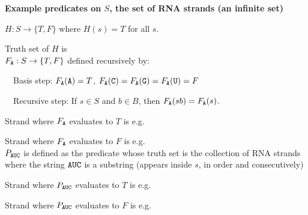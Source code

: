 
{\bf Example predicates on $S$, the set of RNA strands (an infinite set)}


$H: S \to \{T, F\}$ where $H(s) = T$ for all $s$.

Truth set of $H$ is \underline{}\\

$F_{\texttt{A}}: S \to \{T, F\}$  defined recursively by: 

~~Basis step: $F_{\texttt{A}}(\texttt{A}) = T$, $F_{\texttt{A}}(\texttt{C}) = F_{\texttt{A}}(\texttt{G}) = F_{\texttt{A}}(\texttt{U}) = F$

~~Recursive step: If $s \in S$ and $b \in B$, then $F_{\texttt{A}}(sb) = F_{\texttt{A}}(s)$.

Strand where $F_{\texttt{A}}$ evaluates to $T$ is e.g.\underline{\phantom{$\A\C\G$~\hspace{0.3in}}}

Strand where $F_{\texttt{A}}$ evaluates to $F$ is e.g. \underline{\phantom{$\U\A\C\U$\hspace{0.3in}}}\\

$P_{\texttt{A}\texttt{U}\texttt{C}}$ is defined as the predicate whose truth set
is the collection of RNA strands where the string $\texttt{A}\texttt{U}\texttt{C}$
is a substring (appears inside $s$, in order and consecutively)

Strand where $P_{\texttt{A}\texttt{U}\texttt{C}}$ evaluates to $T$ is e.g.\underline{\phantom{$\A\A\A$~\hspace{0.3in}}}

Strand where $P_{\texttt{A}\texttt{U}\texttt{C}}$ evaluates to $F$ is e.g. \underline{\phantom{$\A\A\U\A$\hspace{0.3in}}}\\